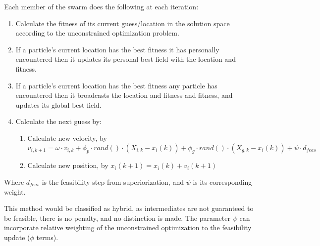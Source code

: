 \documentclass{article}
\begin{document}
Each member of the swarm does the following at each iteration:
\begin{enumerate}
\item Calculate the fitness of its current guess/location in the solution space according to the unconstrained optimization problem.
\item If a particle's current location has the best fitness it has personally encountered then it updates its personal best field with the location and fitness.
\item If a particle's current location has the best fitness any particle has encountered then it broadcasts the location and fitness and fitness, and updates its global best field.
\item Calculate the next guess by:
    \begin{enumerate}
    \item Calculate new velocity, by $v_{i,k+1}=\omega\cdot v_{i,k} + \phi_p\cdot rand()\cdot(X_{i,k}-x_i(k)) + \phi_g\cdot rand()\cdot(X_{g,k}-x_i(k))+ \psi\cdot d_{feas}$
    \item Calculate new position, by $x_i(k+1)=x_i(k)+v_i(k+1)$
    \end{enumerate}
\end{enumerate}
Where $d_{feas}$ is the feasibility step from superiorization, and $\psi$ is its corresponding weight.

This method would be classified as hybrid, as intermediates are not guaranteed to be feasible, there is no penalty, and no distinction is made.  The parameter $\psi$ can incorporate relative weighting of the unconstrained optimization to the feasibility update ($\phi$ terms).
\end{document}
